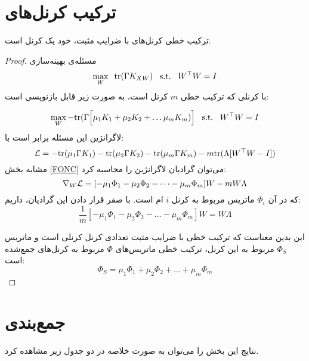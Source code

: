 \section{ترکیب‌ کرنل‌های 
}

\begin{pro}
	ترکیب خطی کرنل‌های 
	با ضرایب مثبت، خود یک کرنل 
	است.
\end{pro}

\begin{proof}
	مسئله‌ی بهینه‌سازی
	\begin{equation}
	\max_W \;\;  \mathrm{tr}(\Gamma K_{XW})\;\;\;\mathrm{s.t.}\;\;\;W^\top W=I
	\end{equation}
با کرنلی که ترکیب خطی 
$m$
کرنل است، به صورت زیر قابل بازنویسی است:

	\begin{equation}
\max_W -\mathrm{tr}(\Gamma\Big[ \mu_1 K_1 + \mu_2 K_2 + \dots \mu_m K_m)\Big]\;\;\;\mathrm{s.t.}\;\;\;W^\top W=I
\end{equation}
لاگرانژین این مسئله برابر است با:
\begin{equation}
\mathcal{L} = - \mathrm{tr}(\mu_1 \Gamma K_1)- \mathrm{tr}(\mu_2 \Gamma K_2) - \mathrm{tr}(\mu_m \Gamma K_m) - m \mathrm{tr}(\Lambda [W^\top W - I])
\end{equation}
مشابه بخش 
\eqref{FONC}
می‌توان گرادیان لاگرانژین را محاسبه کرد:
\begin{equation}
\nabla_W\mathcal{L} = [- \mu_1 \Phi_1 - \mu_2 \Phi_2 -\dots -\mu_m \Phi_m]W - mW\Lambda
\end{equation}
که در آن 
$\Phi_i$
ماتریس مربوط به کرنل 
$i$
ام است. با صفر قرار دادن این گرادیان، داریم:
\begin{equation}
\frac{1}{m} [-\mu_1 \Phi_1 -\mu_2 \Phi_2 -\dots -\mu_m \Phi_m]W = W\Lambda
\end{equation}

این بدین معناست که ترکیب خطی با ضرایب مثبت تعدادی کرنل
کرنلی 
است و ماتریس 
$\Phi_S$
مربوط به این کرنل، ترکیب خطی ماتریس‌های 
$\Phi$
مربوط به کرنل‌های جمع‌شده است:
\begin{equation}
\Phi_S = \mu_1 \Phi_1 + \mu_2 \Phi_2 + \dots + \mu_m \Phi_m
\end{equation}
\end{proof}

\newpage
\section{جمع‌بندی}
نتایج این بخش را می‌توان به صورت خلاصه در دو جدول زیر مشاهده کرد.
\vspace{1cm}

